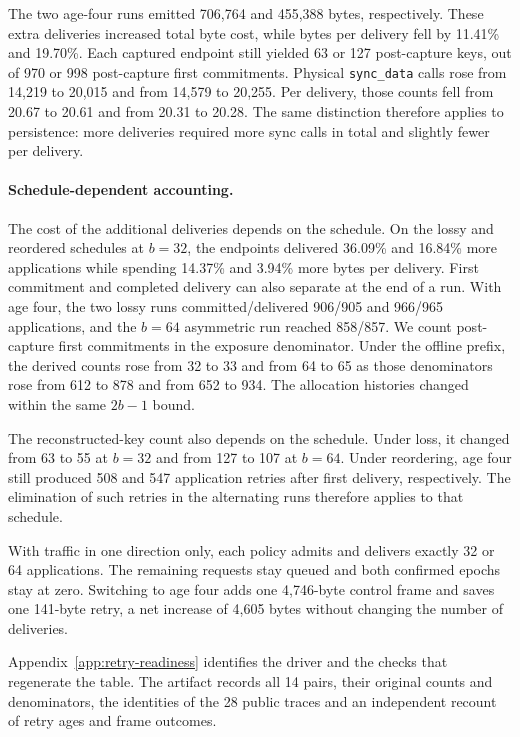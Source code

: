 The two age-four runs emitted 706,764 and 455,388 bytes, respectively.
These extra deliveries increased total byte cost, while bytes per delivery
fell by 11.41\% and 19.70\%. Each captured endpoint still yielded 63 or
127 post-capture keys, out of 970 or 998 post-capture
first commitments. Physical \texttt{sync\_data} calls rose from 14,219
to 20,015 and from 14,579 to 20,255. Per delivery, those counts fell
from 20.67 to 20.61 and from 20.31 to 20.28. The same distinction
therefore applies to persistence: more deliveries required more
sync calls in total and slightly fewer per delivery.

\paragraph{Schedule-dependent accounting.}
The cost of the additional deliveries depends on the schedule. On the lossy
and reordered schedules at $b=32$, the endpoints delivered 36.09\% and
16.84\% more applications while spending 14.37\% and 3.94\% more bytes
per delivery. First commitment and completed delivery can also separate
at the end of a run. With age four, the two lossy runs committed/delivered
906/905 and 966/965 applications, and the $b=64$ asymmetric run reached
858/857. We count post-capture first commitments in the exposure
denominator. Under the offline prefix, the derived counts rose from
32 to 33 and from 64 to 65 as those denominators rose from 612 to 878
and from 652 to 934. The allocation histories changed within the same
$2b-1$ bound.

The reconstructed-key count also depends on the schedule. Under loss,
it changed from 63 to 55 at $b=32$ and from 127 to 107 at $b=64$.
Under reordering, age four still produced 508 and 547 application retries
after first delivery, respectively. The elimination of such retries in
the alternating runs therefore applies to that schedule.

With traffic in one direction only, each policy admits and delivers
exactly 32 or 64 applications. The remaining requests stay queued and
both confirmed epochs stay at zero. Switching to age four adds one
4,746-byte control frame and saves one 141-byte retry, a net increase
of 4,605 bytes without changing the number of deliveries.

Appendix~\ref{app:retry-readiness} identifies the driver and the checks
that regenerate the table. The artifact records all 14 pairs, their
original counts and denominators, the identities of the 28 public traces
and an independent recount of retry ages and frame outcomes.

